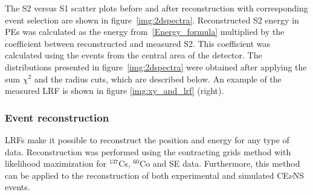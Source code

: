 \documentclass[a4paper,11pt]{article}
\newcommand{\cevns}{CE$\nu$NS}
\begin{document}
The S2 versus S1 scatter plots before and after reconstruction with corresponding event selection are shown in figure~\ref{img:2dspectra}.
Reconstructed S2 energy in PEs was calculated as the energy from~\ref{Energy_formula} multiplied by the coefficient between reconstructed and measured S2. 
This coefficient was calculated using the events from the central area of the detector. 
The distributions presented in figure~\ref{img:2dspectra} were obtained after applying the sum $\chi^2$ and the radius cuts, which are described below. 
An example of the measured LRF is shown in figure \ref{img:xy_and_lrf} (right). 

\subsubsection{Event reconstruction}
\label{subsubsec:rec_res}
LRFs make it possible to reconstruct the position and energy for any type of data. 
Reconstruction was performed using the contracting grids method with likelihood maximization for $^{137}$Cs, $^{60}$Co and SE data. Furthermore, this method can be applied to the reconstruction of both experimental and simulated \cevns{} events.
\end{document}

